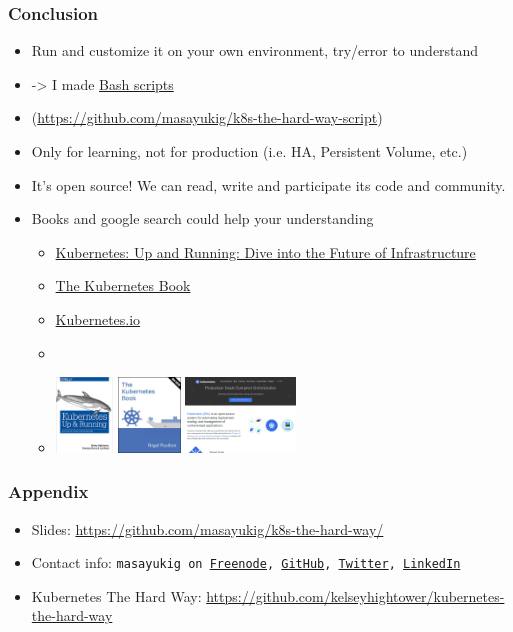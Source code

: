\documentclass[aspectratio=169,11pt,hyperref={colorlinks=true}]{beamer}
\begin{document}
\begin{frame}
  \frametitle{Conclusion}
  \begin{itemize}
    \item Run and customize it on your own environment, try/error to understand
    \item[] -> I made \href{https://github.com/masayukig/k8s-the-hard-way-script}{Bash scripts}
    \item[] (\url{https://github.com/masayukig/k8s-the-hard-way-script})
    \item Only for learning, not for production (i.e. HA, Persistent Volume, etc.)
    \item It's open source! We can read, write and participate its code and community.
    \item Books and google search could help your understanding
    \begin{itemize}
      \item \href{https://www.amazon.com/dp/B075G373MJ/}{Kubernetes: Up and Running: Dive into the Future of Infrastructure}
      \item
      \href{https://www.amazon.com/dp/B072TS9ZQZ/}{The Kubernetes Book}
      \item
      \href{https://kubernetes.io}{Kubernetes.io}
      \item[]
      \item[] \includegraphics[height=20mm]{images/kubernetes-up-and-running.png}
       \includegraphics[height=20mm]{images/the-kubernetes-book.png}
       \includegraphics[height=20mm]{images/kubernetes-io.png}
    \end{itemize}
  \end{itemize}
\end{frame}

\begin{frame}
  \frametitle{Appendix}
  \begin{itemize}
      \item Slides: \url{https://github.com/masayukig/k8s-the-hard-way/}
      \item Contact info: \texttt{masayukig on
        \href{https://freenode.net/}{Freenode},
        \href{https://github.com/masayukig}{GitHub},
        \href{https://twitter.com/masayukig}{Twitter},
        \href{https://www.linkedin.com/in/masayukig/}{LinkedIn}}
      \item Kubernetes The Hard Way: \url{https://github.com/kelseyhightower/kubernetes-the-hard-way}
  \end{itemize}
\end{frame}
\end{document}
